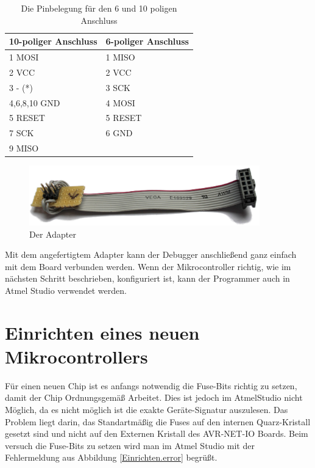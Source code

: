 \begin{table}[H]
\centering
\begin{tabular}{|l|l|} \hline
	 \textbf{10-poliger Anschluss} & \textbf{6-poliger Anschluss} \\ \hline
	 1 MOSI & 1 MISO \\ \hline
	 2 VCC & 2 VCC \\ \hline
	 3 - (*) & 3 SCK \\ \hline
	 4,6,8,10 GND & 4 MOSI \\ \hline
	 5 RESET & 5 RESET \\ \hline
	 7 SCK & 6 GND \\ \hline
	 9 MISO &   \\ \hline
\end{tabular}
\caption{Die Pinbelegung für den 6 und 10 poligen Anschluss \cite{mikrocontroller.isp}}
\label{pinbelegung}
\end{table}

\begin{figure}[htp]
\begin{center}
  \includegraphics[width=10cm]{content/pictures/Anleitung/adapter.jpg}
  \caption{Der Adapter}
  \label{adapter}
\end{center}
\end{figure}

Mit dem angefertigtem Adapter kann der Debugger anschließend ganz einfach mit
dem Board verbunden werden. Wenn der Mikrocontroller richtig, wie im nächsten Schritt
beschrieben, konfiguriert ist, kann der Programmer auch in Atmel Studio
verwendet werden.

\section{Einrichten eines neuen Mikrocontrollers}
\label{Chapt:Einrichten}

Für einen neuen Chip ist es anfangs notwendig die Fuse-Bits richtig zu setzen,
damit der Chip Ordnungsgemäß Arbeitet.
Dies ist jedoch im AtmelStudio nicht Möglich, da es nicht möglich ist die exakte
Geräte-Signatur auszulesen.
Das Problem liegt darin, das Standartmäßig die Fuses auf den internen
Quarz-Kristall gesetzt sind und nicht auf den Externen Kristall des
AVR-NET-IO Boards.
Beim versuch die Fuse-Bits zu setzen wird man im Atmel Studio mit der
Fehlermeldung aus Abbildung \ref{Einrichten.error} begrüßt.

